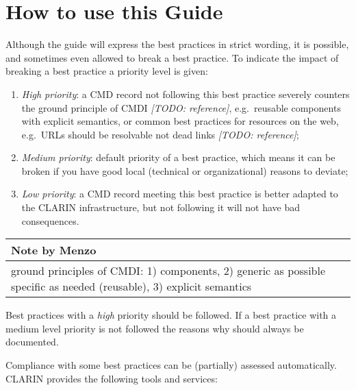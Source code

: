\section{How to use this Guide}

Although the guide will express the best practices in strict wording, it
is possible, and sometimes even allowed to break a best practice. To
indicate the impact of breaking a best practice a priority level is
given:

\begin{enumerate}
\def\labelenumi{\arabic{enumi}.}
\tightlist
\item
  \emph{High priority}: a CMD record not following this best practice
  severely counters the ground principle of CMDI \emph{{[}TODO:
  reference{]}}, e.g.~reusable components with explicit semantics, or
  common best practices for resources on the web, e.g.~URLs should be
  resolvable not dead links \emph{{[}TODO: reference{]}};
\item
  \emph{Medium priority}: default priority of a best practice, which
  means it can be broken if you have good local (technical or
  organizational) reasons to deviate;
\item
  \emph{Low priority}: a CMD record meeting this best practice is better
  adapted to the CLARIN infrastructure, but not following it will not
  have bad consequences.
\end{enumerate}

\begin{longtable}[c]{@{}l@{}}
\toprule
\begin{minipage}[b]{0.07\columnwidth}\raggedright\strut
Note by Menzo
\strut\end{minipage}\tabularnewline
\midrule
\endhead
\begin{minipage}[t]{0.07\columnwidth}\raggedright\strut
ground principles of CMDI: 1) components, 2) generic as possible
specific as needed (reusable), 3) explicit semantics
\strut\end{minipage}\tabularnewline
\bottomrule
\end{longtable}

Best practices with a \emph{high} priority should be followed. If a best
practice with a medium level priority is not followed the reasons why
should always be documented.

Compliance with some best practices can be (partially) assessed
automatically. CLARIN provides the following tools and services:

